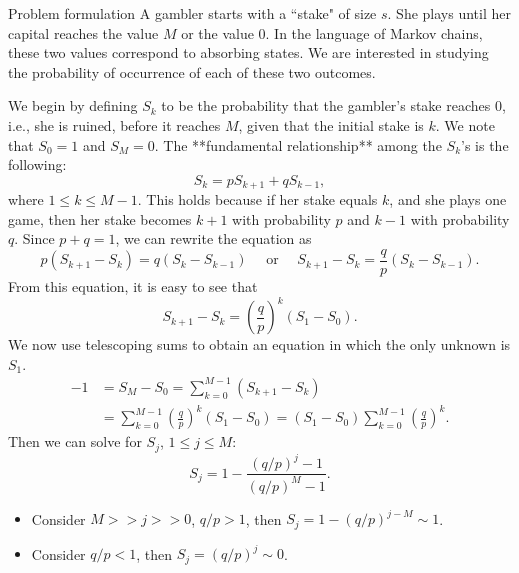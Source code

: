 \begin{newnotion}{Problem formulation}
A gambler starts with a ``stake" of size $s$. She plays until her capital reaches the value $M$ or the value $0$. In the language of Markov chains, these two values correspond to absorbing states. We are interested in studying the probability of occurrence of each of these two outcomes.
\end{newnotion}
We begin by defining $S_k$ to be the probability that the gambler’s stake reaches 0, i.e., she is ruined, before it reaches $M$, given that the initial stake is $k$. We note that $S_0 = 1$ and $S_M = 0$. The **fundamental relationship** among the $S_k$’s is the following:
\begin{equation*}
    S_{k}= p S_{k+1} + q S_{k-1},
\end{equation*}
where $1 \leq k \leq M-1$. This holds because if her stake equals $k$, and she plays one game, then her stake becomes $k + 1$ with probability $p$ and $k-1$ with probability $q$. Since $p+q = 1$, we can rewrite the equation as 
\begin{equation*}
    p\left(S_{k+1}-S_{k}\right)=q\left(S_{k}-S_{k-1}\right) \quad \text{ or }  \quad 
    S_{k+1}-S_{k}=\frac{q}{p}\left(S_{k}-S_{k-1}\right).
\end{equation*}
From this equation, it is easy to see that
\begin{equation*}
    S_{k+1}-S_{k}=\left(\frac{q}{p}\right)^{k}\left(S_{1}-S_{0}\right). 
\end{equation*}
We now use telescoping sums to obtain an equation in which the only unknown is $S_1$.
\begin{equation*}
    \begin{split}
        -1 &= S_M - S_0 = \sum_{k=0}^{M-1}\left(S_{k+1}-S_{k}\right) \\  
        &= \sum_{k=0}^{M-1}\left(\frac{q}{p}\right)^{k}\left(S_{1}-S_{0}\right) = \left(S_{1}-S_{0}\right) \sum_{k=0}^{M-1}\left(\frac{q}{p}\right)^{k}.
    \end{split}
\end{equation*}
Then we can solve for $S_j$, $1\leq j \leq M$:
\begin{equation*}
    S_{j}=1-\frac{(q / p)^{j}-1}{(q / p)^{M}-1}.
\end{equation*}
\begin{itemize}
    \item Consider $M >> j >> 0$, $q/p >1 $, then $S_j = 1-(q/p)^{j-M} \sim 1$.
    \item Consider $q/p < 1$, then $S_j = (q/p)^j \sim 0$.
\end{itemize}







